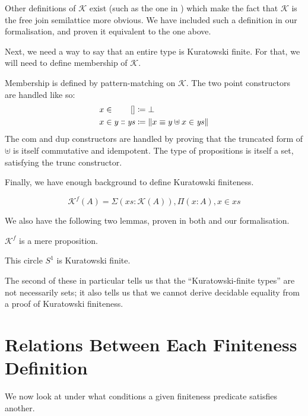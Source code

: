 Other definitions of \(\mathcal{K}\) exist (such as the one in
\cite{fruminFiniteSetsHomotopy2018}) which make the fact that \(\mathcal{K}\) is
the free join semilattice more obvious.
We have included such a definition in our formalisation, and proven it
equivalent to the one above.

Next, we need a way to say that an entire type is Kuratowski finite.
For that, we will need to define membership of \(\mathcal{K}\).
\begin{romdefinition}
  Membership is defined by pattern-matching on \(\mathcal{K}\).
  The two point constructors are handled like so:
  \begin{equation}
    \begin{alignedat}{2}
      x \in&& \; []                      &\coloneqq \bot \\
      x \in&& \; y \dblcolon \mathit{ys} &\coloneqq \lVert x \equiv y \uplus x \in \mathit{ys} \rVert
    \end{alignedat}
  \end{equation}
  The \(\text{com}\) and \(\text{dup}\) constructors are handled by proving that
  the truncated form of \(\uplus\) is itself commutative and idempotent.
  The type of propositions is itself a set, satisfying the \(\text{trunc}\)
  constructor.
\end{romdefinition}
Finally, we have enough background to define Kuratowski finiteness.
\begin{romdefinition}
  \begin{equation}
    \mathcal{K}^{f}(A) = \Sigma {(\mathit{xs} : \mathcal{K}(A))} , \Pi (x : A) , x \in \mathit{xs}
  \end{equation}
\end{romdefinition}

We also have the following two lemmas, proven in both
\cite{fruminFiniteSetsHomotopy2018} and our formalisation.
\begin{romlemma}
  \(\mathcal{K}^f\) is a mere proposition.
\end{romlemma}
\begin{romlemma}
  This circle \(S^1\) is Kuratowski finite.
\end{romlemma}
The second of these in particular tells us that the ``Kuratowski-finite types''
are not necessarily sets; it also tells us that we cannot derive decidable
equality from a proof of Kuratowski finiteness.
\section{Relations Between Each Finiteness Definition}
We now look at under what conditions a given finiteness predicate satisfies
another.
